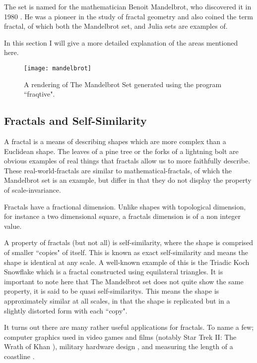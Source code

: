 The set is named for the mathematician Benoit Mandelbrot, who discovered it in 1980 \cite{fracnature , fractimg}. He was a pioneer in the study of 
fractal geometry and also coined the term \gls{fractal}, of which both the Mandelbrot set, and Julia sets are examples of. 

In this section I will give a more detailed explanation of the areas mentioned here. 

\begin{figure}[h]
  \caption{A rendering of The Mandelbrot Set generated using the program ``fraqtive"\cite{fraqtive}.}
  \label{fig:mandelimg}
  \centering
    \texttt{[image: mandelbrot]}
\end{figure}

\subsection*{Fractals and Self-Similarity} 
A \gls{fractal} is a means of describing shapes which are more complex than a Euclidean shape. The leaves of a pine tree or the forks of a 
lightning bolt are obvious examples of real things that fractals allow us to more faithfully describe. 
These \glspl{real-world-fractal} are similar to \glspl{mathematical-fractal}, 
of which the Mandelbrot set is an example, but differ in that they do not display the property of \gls{scale-invariance}. 

Fractals have a fractional dimension. Unlike shapes with topological dimension, for instance a two dimensional square, 
a \glspl{fractal} dimension is of a non integer value.

A property of fractals (but not all) is \gls{self-similarity}, where the shape is comprised of smaller ``copies" of itself. 
This is known as \gls{exact self-similarity} and means the shape is identical at any scale.
A well-known example of this is the Triadic Koch Snowflake which is a fractal constructed using equilateral triangles. 
It is important to note here that The Mandelbrot set does not quite show the same property, it is said to be 
\glspl{quasi self-similarity}. This means the shape is approximately similar at all scales, in that the shape is replicated but in a slightly distorted
form with each ``copy".

It turns out there are many rather useful applications for fractals. To name a few; 
computer graphics used in video games and films (notably Star Trek II: The Wrath of Khan \cite[p.~8]{fractimg}), 
military hardware design \cite{fractantenna}, and measuring the length of a coastline \cite{coastline}.

